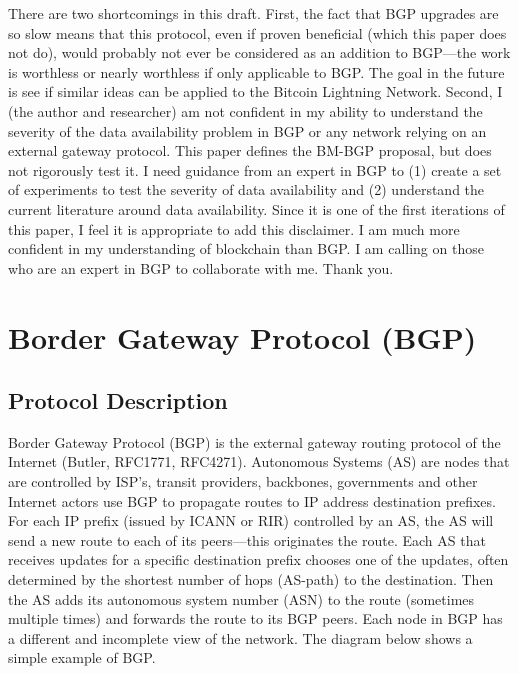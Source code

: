 \documentclass[letterpaper, 10 pt, conference]{ieeeconf}  %
\begin{document}
There are two shortcomings in this draft. First, the fact that BGP upgrades are so slow means that this protocol, even if proven beneficial (which this paper does not do), would probably not ever be considered as an addition to BGP---the work is worthless or nearly worthless if only applicable to BGP. The goal in the future is see if similar ideas can be applied to the Bitcoin Lightning Network. Second, I (the author and researcher) am not confident in my ability to understand the severity of the data availability problem in BGP or any network relying on an external gateway protocol. This paper defines the BM-BGP proposal, but does not rigorously test it. I need guidance from an expert in BGP to (1) create a set of experiments to test the severity of data availability and (2) understand the current literature around data availability. Since it is one of the first iterations of this paper, I feel it is appropriate to add this disclaimer. I am much more confident in my understanding of blockchain than BGP. I am calling on those who are an expert in BGP to collaborate with me. Thank you.  


\section{Border Gateway Protocol (BGP)}

\subsection{Protocol Description}

Border Gateway Protocol (BGP) is the external gateway routing protocol of the Internet (Butler, RFC1771, RFC4271). Autonomous Systems (AS) are nodes that are controlled by ISP’s, transit providers, backbones, governments and other Internet actors use BGP to propagate routes to IP address destination prefixes. For each IP prefix (issued by ICANN or RIR) controlled by an AS, the AS will send a new route to each of its peers---this originates the route. Each AS that receives updates for a specific destination prefix chooses one of the updates, often determined by the shortest number of hops (AS-path) to the destination. Then the AS adds its autonomous system number (ASN) to the route (sometimes multiple times) and forwards the route to its BGP peers. Each node in BGP has a different and incomplete view of the network. The diagram below shows a simple example of BGP.
\end{document}
